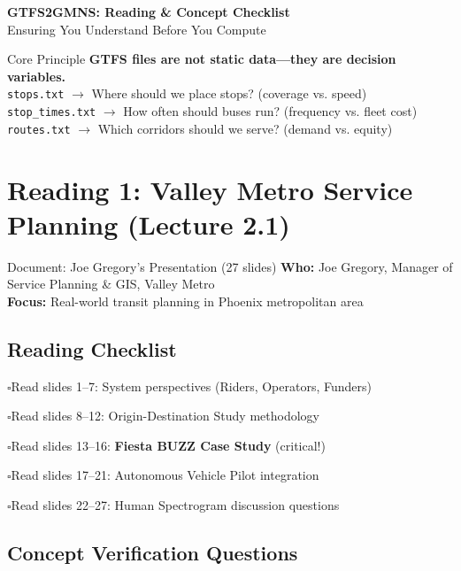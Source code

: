 \documentclass[11pt,letterpaper]{article}
\newcommand{\cmark}{$\square$\hspace{0.3em}}
\begin{document}
\begin{center}
{\LARGE\bfseries\color{asumaroon} GTFS2GMNS: Reading \& Concept Checklist}\\[0.3cm]
{\large Ensuring You Understand Before You Compute}\\[0.3cm]
\end{center}

\begin{conceptbox}{Core Principle}
\textbf{GTFS files are not static data---they are decision variables.}\\[0.2cm]
\texttt{stops.txt} $\rightarrow$ Where should we place stops? (coverage vs. speed)\\
\texttt{stop\_times.txt} $\rightarrow$ How often should buses run? (frequency vs. fleet cost)\\
\texttt{routes.txt} $\rightarrow$ Which corridors should we serve? (demand vs. equity)
\end{conceptbox}

\section{Reading 1: Valley Metro Service Planning (Lecture 2.1)}

\begin{readingbox}{Document: Joe Gregory's Presentation (27 slides)}
\textbf{Who:} Joe Gregory, Manager of Service Planning \& GIS, Valley Metro\\
\textbf{Focus:} Real-world transit planning in Phoenix metropolitan area
\end{readingbox}

\subsection*{Reading Checklist}

\cmark Read slides 1--7: System perspectives (Riders, Operators, Funders)

\cmark Read slides 8--12: Origin-Destination Study methodology

\cmark Read slides 13--16: \textbf{Fiesta BUZZ Case Study} (critical!)

\cmark Read slides 17--21: Autonomous Vehicle Pilot integration

\cmark Read slides 22--27: Human Spectrogram discussion questions

\subsection*{Concept Verification Questions}
\end{document}
